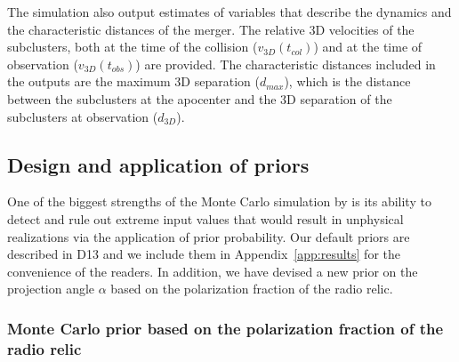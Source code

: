 The simulation also output estimates of variables that describe
the dynamics and the characteristic distances of the merger. The relative
3D velocities of the subclusters, both at the time of the
collision ($v_{3D}(t_{col})$) and at the time of observation
($v_{3D}(t_{obs})$) are provided. The characteristic
distances included in the outputs are the maximum 3D separation ($d_{max}$),
which is the distance between the subclusters at
the apocenter and the 3D separation of the subclusters at observation
($d_{3D}$). 
\subsection{Design and application of priors} 
\label{sec:priors}
%
One of the biggest strengths of the Monte Carlo simulation by  is its ability
to detect and rule out extreme input values that would result in
unphysical realizations via the application of prior probability. 
Our default priors are described in D13 and we include them in
Appendix~\ref{app:results} for the convenience of the readers. 
In addition, we have devised a new prior on the projection angle $\alpha$
based on the polarization fraction of the radio relic.

\subsubsection{Monte Carlo prior based on the polarization fraction of the radio relic}
%

